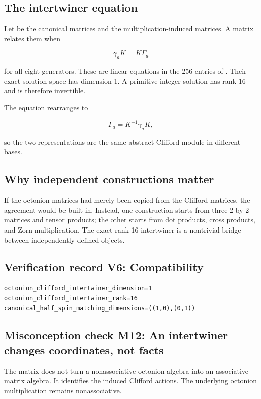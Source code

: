 \documentclass[11pt]{article}
\begin{document}
\subsection{The intertwiner equation}

Let \texttt{} be the canonical matrices and \texttt{} the multiplication-induced matrices. A matrix \texttt{} relates them when

\[
\gamma_aK=K\Gamma_a
\]

for all eight generators. These are linear equations in the 256 entries of \texttt{}. Their exact solution space has dimension 1. A primitive integer solution has rank 16 and is therefore invertible.

The equation rearranges to

\[
\Gamma_a=K^{-1}\gamma_aK,
\]

so the two representations are the same abstract Clifford module in different bases.

\subsection{Why independent constructions matter}

If the octonion matrices had merely been copied from the Clifford matrices, the agreement would be built in. Instead, one construction starts from three 2 by 2 matrices and tensor products; the other starts from dot products, cross products, and Zorn multiplication. The exact rank-16 intertwiner is a nontrivial bridge between independently defined objects.

\subsection{Verification record V6: Compatibility}

\begin{Verbatim}[fontsize=\small]
octonion_clifford_intertwiner_dimension=1
octonion_clifford_intertwiner_rank=16
canonical_half_spin_matching_dimensions=((1,0),(0,1))
\end{Verbatim}

\subsection{Misconception check M12: An intertwiner changes coordinates, not facts}

The matrix \texttt{} does not turn a nonassociative octonion algebra into an associative matrix algebra. It identifies the induced Clifford actions. The underlying octonion multiplication remains nonassociative.
\end{document}
